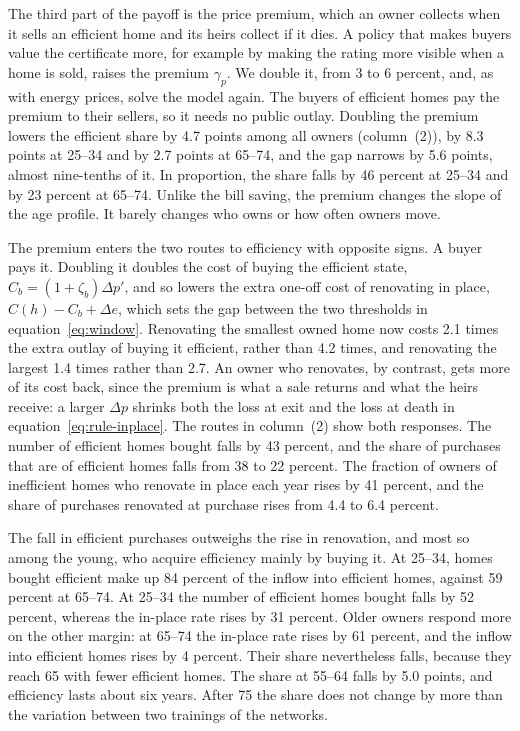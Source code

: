 The third part of the payoff is the price premium, which an owner collects
when it sells an efficient home and its heirs collect if it dies. A policy
that makes buyers value the certificate more, for example by making the
rating more visible when a home is sold, raises the premium $\gamma_p$. We
double it, from 3 to 6 percent, and, as with energy prices, solve the model
again. The buyers of efficient homes pay the premium to their sellers, so it
needs no public outlay. Doubling the premium lowers the efficient share by
4.7 points among all owners (column~(2)), by 8.3 points at 25--34 and by
2.7 points at 65--74, and the gap narrows by 5.6 points, almost nine-tenths
of it. In proportion, the share falls by 46 percent at 25--34 and by 23
percent at 65--74. Unlike the bill saving, the premium changes the slope of
the age profile. It barely changes who owns or how often owners move.

The premium enters the two routes to efficiency with opposite signs. A buyer
pays it. Doubling it doubles the cost of buying the efficient state,
$C_b=(1+\zeta_b)\Delta p'$, and so lowers the extra one-off cost of
renovating in place, $C(h)-C_b+\Delta e$, which sets the gap between the two
thresholds in equation~\eqref{eq:window}. Renovating the smallest owned home
now costs 2.1 times the extra outlay of buying it efficient, rather than 4.2
times, and renovating the largest 1.4 times rather than 2.7. An owner who
renovates, by contrast, gets more of its cost back, since the premium is
what a sale returns and what the heirs receive: a larger $\Delta p$ shrinks
both the loss at exit and the loss at death in
equation~\eqref{eq:rule-inplace}. The routes in column~(2) show both
responses. The number of efficient homes bought falls by 43 percent, and the share of
purchases that are of efficient homes falls from 38 to 22 percent. The
fraction of owners of inefficient homes who renovate in place each year
rises by 41 percent, and the share of purchases renovated at purchase rises
from 4.4 to 6.4 percent.

The fall in efficient purchases outweighs the rise in renovation, and most
so among the young, who acquire efficiency mainly by buying it. At 25--34,
homes bought efficient make up 84 percent of the inflow into efficient
homes, against 59 percent at 65--74. At 25--34 the number of efficient homes
bought falls by 52 percent, whereas the in-place rate rises by 31 percent.
Older owners respond more on the other margin: at 65--74 the in-place rate
rises by 61 percent, and the inflow into efficient homes rises by 4 percent.
Their share nevertheless falls, because they reach 65 with fewer efficient
homes. The share at 55--64 falls by 5.0 points, and efficiency lasts about
six years. After 75 the share does not change by more than the variation
between two trainings of the networks.

